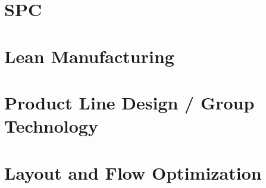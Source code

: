 \section{SPC}\label{sec:spc}

\section{Lean Manufacturing}\label{sec:lean-manufacturing}

\section{Product Line Design / Group Technology}\label{sec:product-line-design}

\section{Layout and Flow Optimization}\label{sec:layout-and-flow-optimization}
